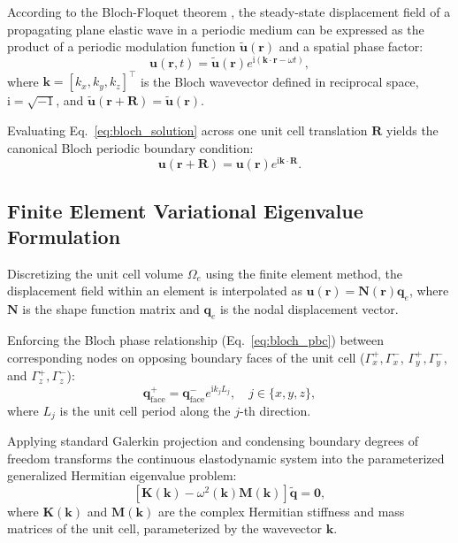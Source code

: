 According to the Bloch-Floquet theorem \cite{brillouin1953}, the steady-state displacement field of a propagating plane elastic wave in a periodic medium can be expressed as the product of a periodic modulation function $\tilde{\mathbf{u}}(\mathbf{r})$ and a spatial phase factor:
\begin{equation}
\mathbf{u}(\mathbf{r}, t) = \tilde{\mathbf{u}}(\mathbf{r}) e^{\mathrm{i} (\mathbf{k} \cdot \mathbf{r} - \omega t)},
\label{eq:bloch_solution}
\end{equation}
where $\mathbf{k} = [k_x, k_y, k_z]^\top$ is the Bloch wavevector defined in reciprocal space, $\mathrm{i} = \sqrt{-1}$, and $\tilde{\mathbf{u}}(\mathbf{r} + \mathbf{R}) = \tilde{\mathbf{u}}(\mathbf{r})$.

Evaluating Eq.~\eqref{eq:bloch_solution} across one unit cell translation $\mathbf{R}$ yields the canonical Bloch periodic boundary condition:
\begin{equation}
\mathbf{u}(\mathbf{r} + \mathbf{R}) = \mathbf{u}(\mathbf{r}) e^{\mathrm{i} \mathbf{k} \cdot \mathbf{R}}.
\label{eq:bloch_pbc}
\end{equation}

\subsection{Finite Element Variational Eigenvalue Formulation}
\label{subsec:fea_eigenvalue}

Discretizing the unit cell volume $\Omega_e$ using the finite element method, the displacement field within an element is interpolated as $\mathbf{u}(\mathbf{r}) = \mathbf{N}(\mathbf{r}) \mathbf{q}_e$, where $\mathbf{N}$ is the shape function matrix and $\mathbf{q}_e$ is the nodal displacement vector.

Enforcing the Bloch phase relationship (Eq.~\eqref{eq:bloch_pbc}) between corresponding nodes on opposing boundary faces of the unit cell ($\Gamma_x^+, \Gamma_x^-$, $\Gamma_y^+, \Gamma_y^-$, and $\Gamma_z^+, \Gamma_z^-$):
\begin{equation}
\mathbf{q}_{\text{face}}^+ = \mathbf{q}_{\text{face}}^- e^{\mathrm{i} k_j L_j}, \quad j \in \{x, y, z\},
\label{eq:nodal_bloch_condition}
\end{equation}
where $L_j$ is the unit cell period along the $j$-th direction.

Applying standard Galerkin projection and condensing boundary degrees of freedom transforms the continuous elastodynamic system into the parameterized generalized Hermitian eigenvalue problem:
\begin{equation}
\left[ \mathbf{K}(\mathbf{k}) - \omega^2(\mathbf{k}) \mathbf{M}(\mathbf{k}) \right] \tilde{\mathbf{q}} = \mathbf{0},
\label{eq:bloch_eigenvalue_problem}
\end{equation}
where $\mathbf{K}(\mathbf{k})$ and $\mathbf{M}(\mathbf{k})$ are the complex Hermitian stiffness and mass matrices of the unit cell, parameterized by the wavevector $\mathbf{k}$.

